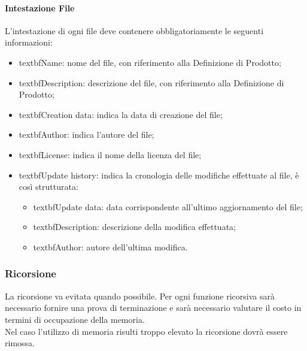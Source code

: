 \documentclass[../NormeDiProgetto.tex]{subfiles}
\begin{document}
                  \paragraph{Intestazione File}
                  L’intestazione di ogni file deve contenere obbligatoriamente le seguenti informazioni:
                  \begin{itemize}
                        \item textbf{Name}: nome del file, con riferimento alla Definizione di Prodotto;
                        \item textbf{Description}: descrizione del file, con riferimento alla Definizione di Prodotto;
                        \item textbf{Creation data}: indica la data di creazione del file;
                        \item textbf{Author}: indica l’autore del file;
                        \item textbf{License}: indica il nome della licenza del file;
                        \item textbf{Update history}: indica la cronologia delle modifiche effettuate al file, è così strutturata:
                              \begin{itemize}
                              \item textbf{Update data}: data corrispondente all’ultimo aggiornamento del file;
                              \item textbf{Description}: descrizione della modifica effettuata;
                              \item textbf{Author}: autore dell’ultima modifica.
                              \end{itemize}
                  \end{itemize}

            \subsubsection{Ricorsione}
            La ricorsione va evitata quando possibile. Per ogni funzione ricorsiva sarà necessario fornire una prova di terminazione e sarà necessario valutare il costo in termini di occupazione della memoria. \\
            Nel caso l'utilizzo di memoria risulti troppo elevato la ricorsione dovrà essere rimossa.
		
\end{document}
